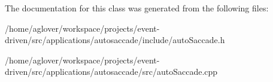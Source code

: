 The documentation for this class was generated from the following files\+:\begin{DoxyCompactItemize}
\item 
/home/aglover/workspace/projects/event-\/driven/src/applications/autosaccade/include/auto\+Saccade.\+h\item 
/home/aglover/workspace/projects/event-\/driven/src/applications/autosaccade/src/auto\+Saccade.\+cpp\end{DoxyCompactItemize}
